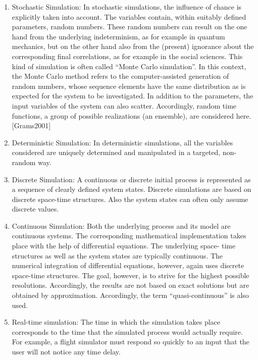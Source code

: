 \begin{enumerate}
\item Stochastic Simulation: In stochastic simulations, the influence of chance is explicitly taken into account. The variables contain, within suitably defined parameters, random numbers. These random numbers can result on the one hand from the underlying indeterminism, as for example in quantum mechanics, but on the other hand also from the (present) ignorance about the corresponding final correlations, as for example in the social sciences. This kind of simulation is often called “Monte Carlo simulation”. In this context, the Monte Carlo method refers to the computer-assisted generation of random numbers, whose sequence elements have the same distribution as is expected for the system to be investigated. In addition to the parameters, the input variables of the system can also scatter. Accordingly, random time functions, a group of possible realizations (an ensemble), are considered here. [Grams2001]

\item Deterministic Simulation: In deterministic simulations, all the variables considered are uniquely determined and manipulated in a targeted, non- random way.

\item Discrete Simulation: A continuous or discrete initial process is represented as a sequence of clearly defined system states. Discrete simulations are based on discrete space-time structures. Also the system states can often only assume discrete values.

\item Continuous Simulation: Both the underlying process and its model are continuous systems. The corresponding mathematical implementation takes place with the help of differential equations. The underlying space- time structures as well as the system states are typically continuous. The numerical integration of differential equations, however, again uses discrete space-time structures. The goal, however, is to strive for the highest possible resolutions. Accordingly, the results are not based on exact solutions but are obtained by approximation. Accordingly, the term “quasi-continuous” is also used.


\item Real-time simulation: The time in which the simulation takes place corresponds to the time that the simulated process would actually require. For example, a flight simulator must respond so quickly to an input that the user will not notice any time delay.


\end{enumerate}
